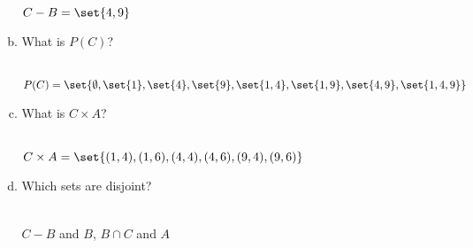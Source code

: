 \documentclass[12pt]{amsart}
\begin{document}
\begin{enumerate}[{\bfseries 1.}]
\begin{enumerate}[(a)]
	\begin{normalize}
	\vspace{0.1in}
	\\ $C - B = \set{4, 9}$
	\end{normalize}
	\vspace{0.1in}
	\item What is $P(C)$?
	\begin{normalize}
	\vspace{0.1in}
	\\ $P(C) = \set{\emptyset, \set{1}, \set{4}, \set{9}, \set{1, 4}, \set{1, 9}, \set{4, 9}, \set{1, 4, 9}}$
	\end{normalize}
	\vspace{0.1in}
	\item What is $C\times A$?
	\begin{normalize}
	\vspace{0.1in}
	\\ $C \times A = \set{(1, 4), (1, 6), (4, 4), (4, 6), (9, 4), (9, 6)}$
	\end{normalize}
	\vspace{0.1in}
	\item Which sets are disjoint?
	\begin{normalize}
	\vspace{0.1in}
	\\ $C - B$ and $B$, $B \cap C$ and $A$
	\end{normalize}
	\end{enumerate}


\end{enumerate}
\end{document}

